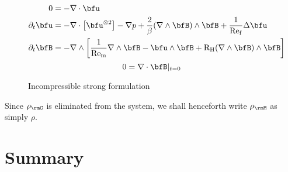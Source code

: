     \begin{figure}
        \centering
        \line
        \begin{align}
            0  &=  - \nabla\cdot\bfu  \\
            \partial_{t}\bfu  &=  -  \nabla\cdot\left[\bfu^{\otimes 2}\right] - \nabla p + \frac{2}{\beta}(\nabla\wedge\bfB)\wedge\bfB + \frac{1}{\rmRef}\Delta\bfu  \\
            \partial_{t}\bfB  &=  - \nabla\wedge\left[\frac{1}{\rmRem}\nabla\wedge\bfB - \bfu\wedge\bfB + \rmRH(\nabla\wedge\bfB)\wedge\bfB\right]
        \end{align}
        \shortline
        \begin{equation}
            0  =  \nabla\cdot\bfB|_{t = 0}
        \end{equation}
        \line
        \caption{Incompressible strong formulation}
        \label{fig:incompressible strong form}
    \end{figure}

    Since $\rho_{\rmC}$ is eliminated from the system, we shall henceforth write $\rho_{\rmM}$ as simply $\rho$.

    
    
    
    
    
    
    

    
    \section*{Summary}
    